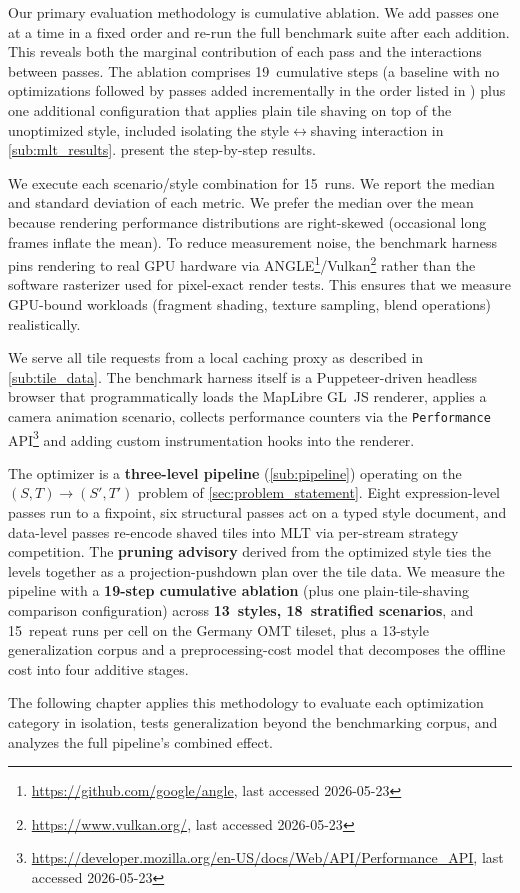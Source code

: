 Our primary evaluation methodology is cumulative ablation.
We add passes one at a time in a fixed order and re-run the full benchmark suite after each addition.
This reveals both the marginal contribution of each pass and the interactions between passes.
The ablation comprises 19~cumulative steps (a baseline with no optimizations followed by passes added incrementally in the order listed in ) plus one additional configuration that applies plain tile shaving on top of the unoptimized style, included isolating the style$\leftrightarrow$shaving interaction in \cref{sub:mlt_results}.
 present the step-by-step results.

We execute each scenario/style combination for 15~runs.
We report the median and standard deviation of each metric.
We prefer the median over the mean because rendering performance distributions are right-skewed (occasional long frames inflate the mean).
To reduce measurement noise, the benchmark harness pins rendering to real \ac{GPU} hardware via ANGLE\footnote{\url{https://github.com/google/angle}, last accessed 2026-05-23}/Vulkan\footnote{\url{https://www.vulkan.org/}, last accessed 2026-05-23} rather than the software rasterizer used for pixel-exact render tests.
This ensures that we measure \ac{GPU}-bound workloads (fragment shading, texture sampling, blend operations) realistically.

We serve all tile requests from a local caching proxy as described in \cref{sub:tile_data}.
The benchmark harness itself is a Puppeteer-driven headless browser that programmatically loads the MapLibre GL~JS renderer, applies a camera animation scenario, collects performance counters via the \texttt{Performance} \ac{API}\footnote{\url{https://developer.mozilla.org/en-US/docs/Web/API/Performance_API}, last accessed 2026-05-23} and adding custom instrumentation hooks into the renderer.

\begin{chaptersummary}
The optimizer is a \textbf{three-level pipeline} (\cref{sub:pipeline}) operating on the $(S, T) \to (S', T')$ problem of \cref{sec:problem_statement}.
Eight expression-level passes run to a fixpoint, six structural passes act on a typed style document, and data-level passes re-encode shaved tiles into \ac{MLT} via per-stream strategy competition.
The \textbf{pruning advisory} derived from the optimized style ties the levels together as a projection-pushdown plan over the tile data.
We measure the pipeline with a \textbf{19-step cumulative ablation} (plus one plain-tile-shaving comparison configuration) across \textbf{13~styles, 18~stratified scenarios}, and 15~repeat runs per cell on the Germany \ac{OMT} tileset, plus a 13-style generalization corpus and a preprocessing-cost model that decomposes the offline cost into four additive stages.

The following chapter applies this methodology to evaluate each optimization category in isolation, tests generalization beyond the benchmarking corpus, and analyzes the full pipeline's combined effect.
\end{chaptersummary}
